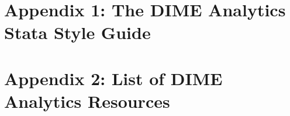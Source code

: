 


\chapter{Appendix 1: The DIME Analytics Stata Style Guide}
\label{ap:1}




\chapter{Appendix 2: List of DIME Analytics Resources}
\label{ap:2}





\backmatter




\printindex %


